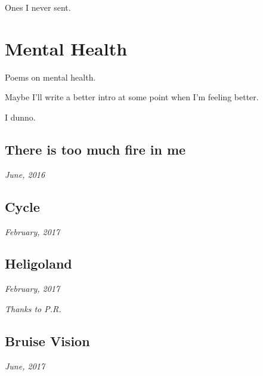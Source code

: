 \documentclass[10pt]{memoir}
\begin{document}
  \hfill Ones I never sent.
  \thispagestyle{empty}
  \newpage


  


  \chapter{Mental Health}

  Poems on mental health.

  \vfill

  \noindent Maybe I'll write a better intro at some point when I'm feeling better.

  \vfill

  \hfill I dunno.
  \thispagestyle{empty}
  \newpage


  \section{There is too much fire in me}

  \hfill\textit{June, 2016}

  
  \newpage


  \section{Cycle}

  \hfill\textit{February, 2017}

  
  \newpage


  \section{Heligoland}

  \hfill\textit{February, 2017}

  

  \textit{Thanks to P.R.}
  \newpage


  \section{Bruise Vision}

  \hfill\textit{June, 2017}
\end{document}
